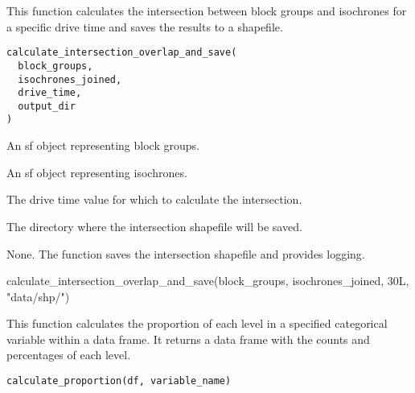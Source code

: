 \documentclass[a4paper]{book}
\begin{document}
%
\begin{Description}
This function calculates the intersection between block groups and isochrones for a specific drive time and saves the results to a shapefile.
\end{Description}
%
\begin{Usage}
\begin{verbatim}
calculate_intersection_overlap_and_save(
  block_groups,
  isochrones_joined,
  drive_time,
  output_dir
)
\end{verbatim}
\end{Usage}
%
\begin{Arguments}
\begin{ldescription}
\item[\code{block\_groups}] An sf object representing block groups.

\item[\code{isochrones\_joined}] An sf object representing isochrones.

\item[\code{drive\_time}] The drive time value for which to calculate the intersection.

\item[\code{output\_dir}] The directory where the intersection shapefile will be saved.
\end{ldescription}
\end{Arguments}
%
\begin{Value}
None. The function saves the intersection shapefile and provides logging.
\end{Value}
%
\begin{Examples}
\begin{ExampleCode}
calculate_intersection_overlap_and_save(block_groups, isochrones_joined, 30L, "data/shp/")

\end{ExampleCode}
\end{Examples}
%
\begin{Description}
This function calculates the proportion of each level in a specified categorical variable within a data frame.
It returns a data frame with the counts and percentages of each level.
\end{Description}
%
\begin{Usage}
\begin{verbatim}
calculate_proportion(df, variable_name)
\end{verbatim}
\end{Usage}
\end{document}
